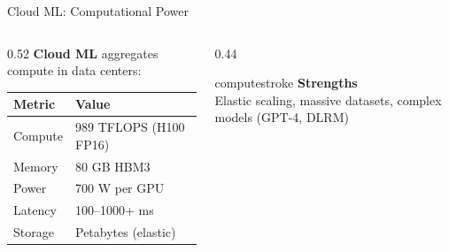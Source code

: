 \documentclass[aspectratio=169, 12pt]{beamer}
\begin{document}
\begin{frame}{Cloud ML: Computational Power}
\note{
%
%
%
%
}

\small
\begin{columns}[T]
  \begin{column}{0.52\textwidth}
    \textbf{Cloud ML} aggregates compute in data centers:

    \vspace{0.15cm}
    {\footnotesize
    \renewcommand{\arraystretch}{1.15}
    \begin{tabular}{@{}ll@{}}
      \toprule
      \textbf{Metric} & \textbf{Value} \\
      \midrule
      Compute    & 989 TFLOPS (H100 FP16) \\
      Memory     & 80 GB HBM3 \\
      Power      & 700 W per GPU \\
      Latency    & 100--1000+ ms \\
      Storage    & Petabytes (elastic) \\
      \bottomrule
    \end{tabular}
    }

    \vspace{0.15cm}
  \end{column}
  \begin{column}{0.44\textwidth}
    \vspace{0.2cm}
    \begin{mlsyscard}{computestroke}
    \textbf{Strengths}\\
    {\footnotesize Elastic scaling, massive datasets, complex models (GPT-4, DLRM)}
    \end{mlsyscard}


\end{column}
\end{columns}
\end{frame}
\end{document}
